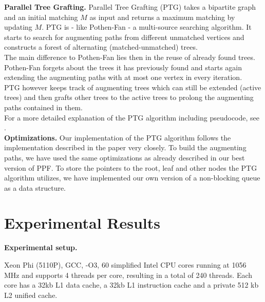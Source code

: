 \documentclass[letterpaper]{article}
\newcommand{\mypar}[1]{{\bf #1.}}
\begin{document}
\mypar{Parallel Tree Grafting} 
Parallel Tree Grafting (PTG) takes a bipartite graph and an initial matching $M$ as input and returns a maximum matching by updating $M$.
PTG is - like Pothen-Fan - a multi-source searching algorithm. It starts to search for augmenting paths from different unmatched vertices and constructs a forest of alternating (matched-unmatched) trees.\\
The main difference to Pothen-Fan lies then in the reuse of already found trees. Pothen-Fan forgets about the trees it has previously found and starts again extending the augmenting paths with at most one vertex in every iteration. \\
PTG however keeps track of augmenting trees which can still be extended (active trees) and then grafts other trees to the active trees to prolong the augmenting paths contained in them.\\
For a more detailed explanation of the PTG algorithm including pseudocode, see \cite{Azad:2015}.\\
\mypar{Optimizations}
Our implementation of the PTG algorithm follows the implementation described in the paper very closely. To build the augmenting paths, we have used the same optimizations as already described in our best version of  PPF. To store the pointers to the root, leaf and other nodes the PTG algorithm utilizes, we have implemented our own version of a non-blocking queue as a data structure. 

\section{Experimental Results}\label{sec:exp}


\mypar{Experimental setup} 

Xeon Phi (5110P), GCC, -O3, 60 simplified Intel CPU cores running at 1056 MHz and supports 4 threads per core, resulting in a total of 240 threads. Each core has a 32kb L1 data cache, a 32kb L1 instruction cache and a private 512 kb L2 unified cache. \cite{Ramos:2013}
\end{document}
